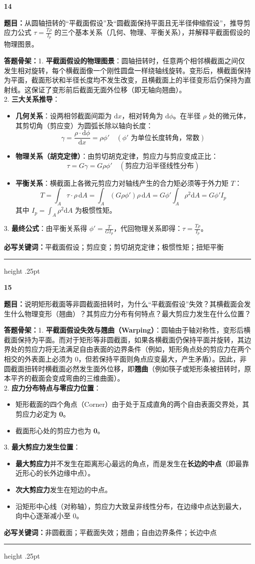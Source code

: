 \documentclass[a4paper,10pt]{article}
\newcommand{\qitem}[5]{%
\Needspace{6\baselineskip}
\vspace{3pt}
{\Large\bfseries\color{deep} #1}\quad{\bfseries\color{orangea}#2}\par
\textbf{题目：}#3\par
\textbf{答题骨架：}#4\par
\textbf{必写关键词：}{\color{bluea}#5}\par
\vspace{2pt}\hrule height .25pt
}
\begin{document}
\qitem{14}{圆轴扭转公式来源}
{从圆轴扭转的“平截面假设”及“圆截面保持平面且无半径伸缩假设”，推导剪应力公式 \(\tau=\frac{T\rho}{I_p}\) 的三个基本关系（几何、物理、平衡关系），并解释平截面假设的物理图景。}
{1. \textbf{平截面假设的物理图景}：圆轴扭转时，任意两个相邻横截面之间仅发生相对旋转，每个横截面像一个刚性圆盘一样绕轴线旋转。变形后，横截面保持为平面，截面形状和半径长度均不发生改变，且横截面上的半径变形后仍保持为直射线。这保证了变形前后截面无面外位移（即无轴向翘曲）。\\
2. \textbf{三大关系推导}：
   \begin{itemize}
     \item \textbf{几何关系}：设两相邻截面间距为 \(\mathrm{d}x\)，相对转角为 \(\mathrm{d}\phi\)。在半径 \(\rho\) 处的微元体，其剪切角（剪应变）为圆弧长除以轴向长度：
           \[ \gamma = \frac{\rho \cdot \mathrm{d}\phi}{\mathrm{d}x} = \rho \phi' \quad (\phi' \text{ 为单位长度转角，常数}) \]
     \item \textbf{物理关系（胡克定律）}：由剪切胡克定律，剪应力与剪应变成正比：
           \[ \tau = G \gamma = G \rho \phi' \quad (\text{剪应力沿半径线性分布}) \]
     \item \textbf{平衡关系}：横截面上各微元剪应力对轴线产生的合力矩必须等于外力矩 \(T\)：
           \[ T = \int_A \tau \cdot \rho \, \mathrm{d}A = \int_A (G \rho \phi') \rho \, \mathrm{d}A = G \phi' \int_A \rho^2 \mathrm{d}A = G \phi' I_p \]
           其中 \(I_p = \int_A \rho^2 \mathrm{d}A\) 为极惯性矩。
   \end{itemize}
3. \textbf{最终公式}：由平衡关系得 \(\phi' = \frac{T}{G I_p}\)，代回物理关系即得：\(\tau = \frac{T\rho}{I_p}\)。}
{平截面假设；剪应变；剪切胡克定律；极惯性矩；扭矩平衡}

\qitem{15}{非圆截面扭转与翘曲}
{说明矩形截面等非圆截面扭转时，为什么“平截面假设”失效？其横截面会发生什么物理变形（翘曲）？其剪应力分布有何特点？最大剪应力发生在什么位置？}
{1. \textbf{平截面假设失效与翘曲（Warping）}：圆轴由于轴对称性，变形后横截面保持为平面。而对于矩形等非圆截面，如果各横截面仍保持平面并旋转，其边界处的剪应力将无法满足自由表面的边界条件（例如，矩形角点处的剪应力在两个相交的外表面上必须为 0，但若保持平面则角点应变最大，产生矛盾）。因此，非圆截面扭转时横截面必然发生面外位移，即\textbf{翘曲}（例如筷子或矩形条被扭转时，原本平齐的截面会变成弯曲的三维曲面）。\\
2. \textbf{应力分布特点与零应力位置}：
   \begin{itemize}
     \item 矩形截面的四个角点（Corner）由于处于互成直角的两个自由表面交界处，其剪应力必定为 \textbf{0}。
     \item 截面形心处的剪应力也为 \textbf{0}。
   \end{itemize}
3. \textbf{最大剪应力发生位置}：
   \begin{itemize}
     \item \textbf{最大剪应力}并不发生在距离形心最远的角点，而是发生在\textbf{长边的中点}（即最靠近形心的长外边缘中点）。
     \item \textbf{次大剪应力}发生在短边的中点。
     \item 沿矩形中心线（对称轴），剪应力大致呈非线性分布，在边缘中点达到最大，向中心逐渐减小至 0。
   \end{itemize}}
{非圆截面；平截面失效；翘曲；自由边界条件；长边中点}
\end{document}

